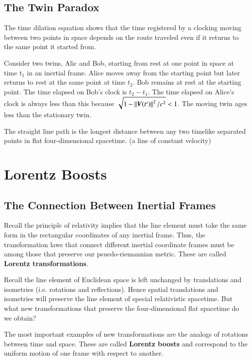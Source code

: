\subsection{The Twin Paradox}

The time dilation equation shows that the time registered by a clocking moving between two points in space depends on the route traveled even if it returns to the same point it started from.

Consider two twins, Alic and Bob, starting from rest at one point in space at time $t_1$ in an inertial frame. Alice moves away from the starting point but later returns to rest at the same point at time $t_2$. Bob remains at rest at the starting point. The time elapsed on Bob's clock is $t_2-t_1$. The time elapsed on Alice's clock is always less than this because $\sqrt{1-\norm{\vec{V}(t')}^2/c^2} < 1$. The moving twin ages less than the stationary twin.

\begin{rmk}
    The straight line path is the longest distance between any two timelike separated points in flat four-dimensional spacetime. (a line of constant velocity)
\end{rmk}


\section{Lorentz Boosts}
\label{sec:LorBoosts}

\subsection{The Connection Between Inertial Frames}

Recall the principle of relativity implies that the line element must take the same form in the rectangular coordinates of any inertial frame. Thus, the transformation laws that connect different inertial coordinate frames must be among those that preserve our psuedo-riemannian metric. These are called \textbf{Lorentz transformations}.

Recall the line element of Euclidean space is left unchanged by translations and isometries (i.e. rotations and reflections). Hence spatial translations and isometries will preserve the line element of special relativistic spacetime. But what new transformations that preserve the four-dimensional flat spacetime do we obtain? 

The most important examples of new transformations are the analogs of rotations between time and space. These are called \textbf{Lorentz boosts} and correspond to the uniform motion of one frame with respect to another.

